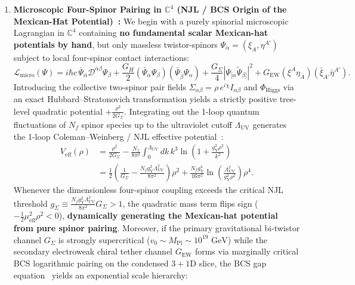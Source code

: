 \documentclass[11pt,a4paper]{article}
\begin{document}
\begin{enumerate}
    \item \textbf{Microscopic Four-Spinor Pairing in $\mathbb{C}^4$ (NJL / BCS Origin of the Mexican-Hat Potential)~\cite{NJL1961,ColemanWeinberg1973}:}
    We begin with a purely spinorial microscopic Lagrangian in $\mathbb{C}^4$ containing \textbf{no fundamental scalar Mexican-hat potentials by hand}, but only massless twistor-spinors $\Psi_\alpha = (\xi_A, \eta^{A'})$ subject to local four-spinor contact interactions:
    \begin{equation}
    \mathcal{L}_{\text{micro}}(\Psi) = i\hbar c\, \bar{\Psi}_{\bar{\alpha}} \mathcal{D}^{\bar{\alpha}\beta} \Psi_\beta + \frac{G_H}{2}\left(\bar{\Psi}_{\bar{\alpha}}\Psi_\beta\right)\left(\bar{\Psi}_{\bar{\beta}}\Psi_\alpha\right) + \frac{G_\Sigma}{4}\left| \Psi_{[\alpha}\tilde{\Psi}_{\beta]} \right|^2 + G_{\text{EW}}\left(\xi^A \eta_A\right)\left(\bar{\xi}_{A'}\bar{\eta}^{A'}\right).
    \end{equation}
    Introducing the collective two-spinor pair fields $\Sigma_{\alpha\beta} = \rho\, e^{i\chi} I_{\alpha\beta}$ and $\Phi_{\text{Higgs}}$ via an exact Hubbard--Stratonovich transformation yields a strictly positive tree-level quadratic potential $+\frac{\rho^2}{2G_\Sigma}$. Integrating out the 1-loop quantum fluctuations of $N_f$ spinor species up to the ultraviolet cutoff $\Lambda_{\text{UV}}$ generates the 1-loop Coleman--Weinberg / NJL effective potential~\cite{NJL1961,ColemanWeinberg1973}:
    \begin{equation}
    \begin{aligned}
    V_{\text{eff}}(\rho) &= \frac{\rho^2}{2G_\Sigma} - \frac{N_f}{8\pi^2} \int_0^{\Lambda_{\text{UV}}} dk\, k^3 \ln\!\left(1 + \frac{g_{\text{Y}}^2 \rho^2}{k^2}\right) \\
    &= \frac{1}{2}\left(\frac{1}{G_\Sigma} - \frac{N_f g_{\text{Y}}^2 \Lambda_{\text{UV}}^2}{8\pi^2}\right)\rho^2 + \frac{N_f g_{\text{Y}}^4}{16\pi^2}\ln\!\left(\frac{\Lambda_{\text{UV}}^2}{g_{\text{Y}}^2\rho^2}\right)\rho^4.
    \end{aligned}
    \end{equation}
    Whenever the dimensionless four-spinor coupling exceeds the critical NJL threshold $g_\Sigma \equiv \frac{N_f g_{\text{Y}}^2 \Lambda_{\text{UV}}^2}{8\pi^2} G_\Sigma > 1$, the quadratic mass term flips sign ($-\frac{1}{2}\mu_{\text{eff}}^2 \rho^2 < 0$), \textbf{dynamically generating the Mexican-hat potential from pure spinor pairing}. Moreover, if the primary gravitational bi-twistor channel $G_\Sigma$ is strongly supercritical ($v_0 \sim M_{\text{Pl}} \sim 10^{19}\text{ GeV}$) while the secondary electroweak chiral tether channel $G_{\text{EW}}$ forms via marginally critical BCS logarithmic pairing on the condensed $3+1\text{D}$ slice, the BCS gap equation~\cite{NJL1961} yields an exponential scale hierarchy:

\end{enumerate}
\end{document}
